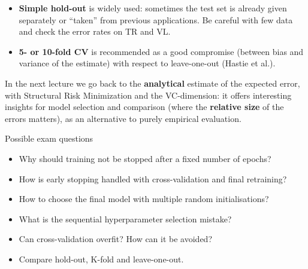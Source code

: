 \begin{itemize}
\tightlist
\item
  \textbf{Simple hold-out} is widely used: sometimes the test set is
  already given separately or ``taken'' from previous applications. Be
  careful with few data and check the error rates on TR and VL.
\item
  \textbf{5- or 10-fold CV} is recommended as a good compromise
  (between bias and variance of the estimate) with respect to
  leave-one-out (Hastie et al.).
\end{itemize}

In the next lecture we go back to the \textbf{analytical} estimate of
the expected error, with Structural Risk Minimization and the
VC-dimension: it offers interesting insights for model selection and
comparison (where the \textbf{relative size} of the errors matters), as
an alternative to purely empirical evaluation.

\begin{boxquestion}{Possible exam questions}

\begin{itemize}
\tightlist
\item
  Why should training not be stopped after a fixed number of epochs?
\item
  How is early stopping handled with cross-validation and final
  retraining?
\item
  How to choose the final model with multiple random initialisations?
\item
  What is the sequential hyperparameter selection mistake?
\item
  Can cross-validation overfit? How can it be avoided?
\item
  Compare hold-out, K-fold and leave-one-out.
\end{itemize}

\end{boxquestion}
